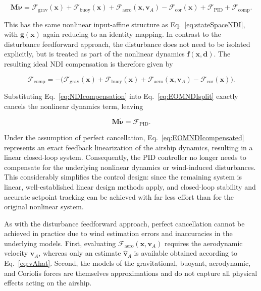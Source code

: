 \begin{equation}
	\bm{M}\dot{\bm{\nu}}
	=
	\bm{\mathcal{F}}_\mathrm{grav}(\bm{x}) 
	+ 
	\bm{\mathcal{F}}_\mathrm{buoy}(\bm{x}) 
	+ 
	\bm{\mathcal{F}}_\mathrm{aero}(\bm{x}, \bm{v}_A) 
	- 
	\bm{\mathcal{F}}_\mathrm{cor}(\bm{x})
	+ 
	\bm{\mathcal{F}}_\mathrm{PID} 
	+ 
	\bm{\mathcal{F}}_\mathrm{comp}.
	\label{eq:EOMNDIsplit}
\end{equation}

This has the same nonlinear input-affine structure as Eq.~\eqref{eq:stateSpaceNDI}, with $\bm{g}(\bm{x})$ again reducing to an identity mapping. 
In contrast to the disturbance feedforward approach, the disturbance does not need to be isolated explicitly, but is treated as part of the nonlinear dynamics $\bm{f}(\bm{x}, \bm{d})$. The resulting ideal NDI compensation is therefore given by

\begin{equation}
	\bm{\mathcal{F}}_\mathrm{comp} 
	= 
	-\Big(
	\bm{\mathcal{F}}_\mathrm{grav}(\bm{x}) 
	+ 
	\bm{\mathcal{F}}_\mathrm{buoy}(\bm{x}) 
	+ 
	\bm{\mathcal{F}}_\mathrm{aero}(\bm{x}, \bm{v}_A) 
	- 
	\bm{\mathcal{F}}_\mathrm{cor}(\bm{x})
	\Big).
	\label{eq:NDIcompensation}
\end{equation}

Substituting Eq.~\eqref{eq:NDIcompensation} into Eq.~\eqref{eq:EOMNDIsplit} exactly cancels the nonlinear dynamics term, leaving

\begin{equation}
	\bm{M}\dot{\bm{\nu}} = \bm{\mathcal{F}}_\mathrm{PID}.
	\label{eq:EOMNDIcompensated}
\end{equation}

Under the assumption of perfect cancellation, Eq.~\eqref{eq:EOMNDIcompensated} represents an exact feedback linearization of the airship dynamics, resulting in a linear closed-loop system. Consequently, the PID controller no longer needs to compensate for the underlying nonlinear dynamics or wind-induced disturbances. This considerably simplifies the control design: since the remaining system is linear, well-established linear design methods apply, and closed-loop stability and accurate setpoint tracking can be achieved with far less effort than for the original nonlinear system.

As with the disturbance feedforward approach, perfect cancellation cannot be achieved in practice due to wind estimation errors and inaccuracies in the underlying models. First, evaluating $\bm{\mathcal{F}}_\mathrm{aero}(\bm{x}, \bm{v}_A)$ requires the aerodynamic velocity $\bm{v}_A$, whereas only an estimate $\hat{\bm{v}}_A$ is available obtained according to Eq.~\eqref{eq:vAhat}. Second, the models of the gravitational, buoyant, aerodynamic, and Coriolis forces are themselves approximations and do not capture all physical effects acting on the airship. 

